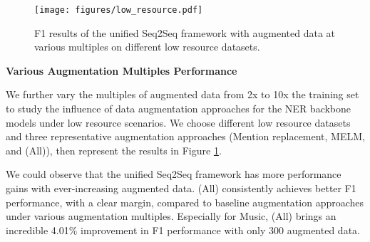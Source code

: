 \begin{figure}[t!]
    \centering
    \texttt{[image: figures/low\_resource.pdf]}
    \caption{F1 results of the unified Seq2Seq framework with augmented data at various multiples on different low resource datasets.}
    \label{fig:real}
\vspace{-4mm}
\end{figure}

\begin{table}[t!]
\centering
{}
\caption{Perplexity of the augmented data with various augmentation approaches. Lower perplexity is better.}
\label{tab:perplexity}
\vspace{-1mm}
\end{table}

\noindent\textbf{Various Augmentation Multiples Performance}

We further vary the multiples of augmented data from 2x to 10x the training set to study the influence of data augmentation approaches for the NER backbone models under low resource scenarios. 
We choose different low resource datasets and three representative augmentation approaches (Mention replacement, MELM, and {\modelname} (All)), then represent the results in Figure \ref{fig:real}.

We could observe that the unified Seq2Seq framework has more performance gains with ever-increasing augmented data. {\modelname} (All) consistently achieves better F1 performance, with a clear margin, compared to baseline augmentation approaches under various augmentation multiples. Especially for Music, {\modelname} (All) brings an incredible 4.01\% improvement in F1 performance with only 300 augmented data.

